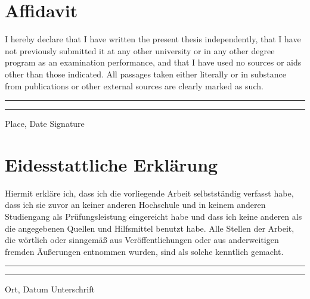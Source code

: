 \documentclass[../../main.tex]{subfiles}
\begin{document}
\section*{Affidavit}

I hereby declare that I have written the present thesis independently, that I have not previously submitted it at any other university or in any other degree program as an examination performance, and that I have used no sources or aids other than those indicated. All passages taken either literally or in substance from publications or other external sources are clearly marked as such.

\vspace{2cm}

\hspace{1cm}\rule{4cm}{0.25pt}\hspace{4cm}\rule{6cm}{0.25pt} 

\hspace{1cm} Place, Date \hspace{6cm} Signature \hspace{2cm}

\vspace{7cm}

\section*{Eidesstattliche Erklärung}

Hiermit erkläre ich, dass ich die vorliegende Arbeit selbstständig verfasst habe, dass ich sie zuvor an keiner anderen Hochschule und in keinem anderen Studiengang als Prüfungsleistung eingereicht habe und dass ich keine anderen als die angegebenen Quellen und Hilfsmittel benutzt habe. Alle Stellen der Arbeit, die wörtlich oder sinngemäß aus Veröffentlichungen oder aus anderweitigen fremden Äußerungen entnommen wurden, sind als solche kenntlich gemacht. 

\vspace{2cm}

\hspace{1cm}\rule{4cm}{0.25pt}\hspace{4cm}\rule{6cm}{0.25pt} 

\hspace{1cm} Ort, Datum \hspace{6cm} Unterschrift \hspace{2cm}
\end{document}
